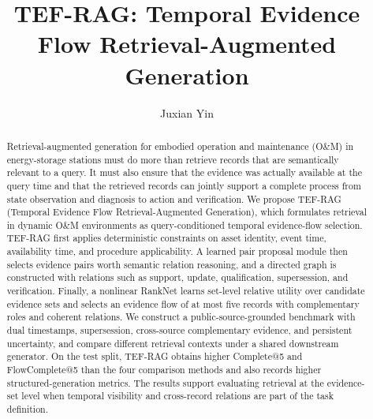 \documentclass[letterpaper,10pt,conference]{IEEEtran}
\title{TEF-RAG: Temporal Evidence Flow Retrieval-Augmented Generation}
\author{Juxian Yin}
\begin{document}
\maketitle

\begin{abstract}
Retrieval-augmented generation for embodied operation and maintenance (O\&M) in energy-storage stations must do more than retrieve records that are semantically relevant to a query. It must also ensure that the evidence was actually available at the query time and that the retrieved records can jointly support a complete process from state observation and diagnosis to action and verification. We propose TEF-RAG (Temporal Evidence Flow Retrieval-Augmented Generation), which formulates retrieval in dynamic O\&M environments as query-conditioned temporal evidence-flow selection. TEF-RAG first applies deterministic constraints on asset identity, event time, availability time, and procedure applicability. A learned pair proposal module then selects evidence pairs worth semantic relation reasoning, and a directed graph is constructed with relations such as support, update, qualification, supersession, and verification. Finally, a nonlinear RankNet learns set-level relative utility over candidate evidence sets and selects an evidence flow of at most five records with complementary roles and coherent relations. We construct a public-source-grounded benchmark with dual timestamps, supersession, cross-source complementary evidence, and persistent uncertainty, and compare different retrieval contexts under a shared downstream generator. On the test split, TEF-RAG obtains higher Complete@5 and FlowComplete@5 than the four comparison methods and also records higher structured-generation metrics. The results support evaluating retrieval at the evidence-set level when temporal visibility and cross-record relations are part of the task definition.
\end{abstract}







\newpage
\appendices

\end{document}
